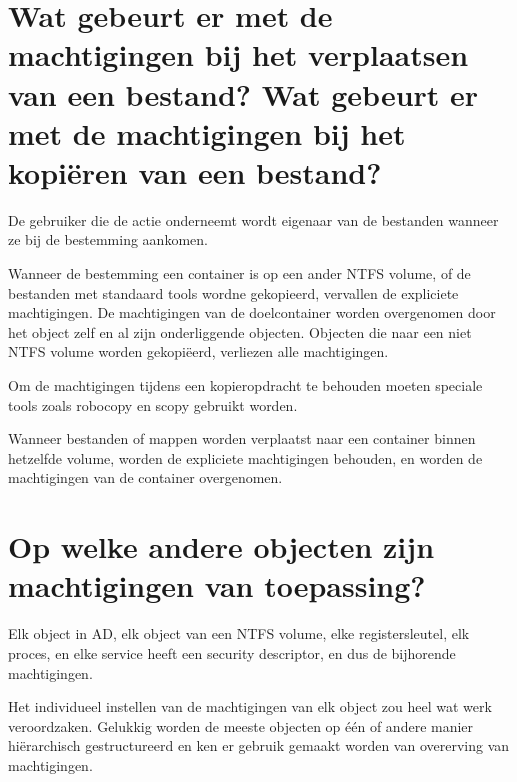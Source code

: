 \section{Wat gebeurt er met de machtigingen bij het verplaatsen van een bestand?
Wat gebeurt er met de machtigingen bij het kopiëren van een bestand?}

De gebruiker die de actie onderneemt wordt eigenaar van de bestanden wanneer ze
bij de bestemming aankomen.

Wanneer de bestemming een container is op een ander NTFS volume, of de bestanden
met standaard tools wordne gekopieerd, vervallen de expliciete machtigingen. De
machtigingen van de doelcontainer worden overgenomen door het object zelf en al
zijn onderliggende objecten. Objecten die naar een niet NTFS volume worden
gekopiëerd, verliezen alle machtigingen.

Om de machtigingen tijdens een kopieropdracht te behouden moeten speciale tools
zoals robocopy en scopy gebruikt worden.

Wanneer bestanden of mappen worden verplaatst naar een container binnen
hetzelfde volume, worden de expliciete machtigingen behouden, en worden de
machtigingen van de container overgenomen.

\section{Op welke andere objecten zijn machtigingen van toepassing?}

Elk object in AD, elk object van een NTFS volume, elke registersleutel, elk
proces, en elke service heeft een security descriptor, en dus de bijhorende
machtigingen.

Het individueel instellen van de machtigingen van elk object zou heel wat werk
veroordzaken. Gelukkig worden de meeste objecten op één of andere manier
hiërarchisch gestructureerd en ken er gebruik gemaakt worden van overerving van
machtigingen.

